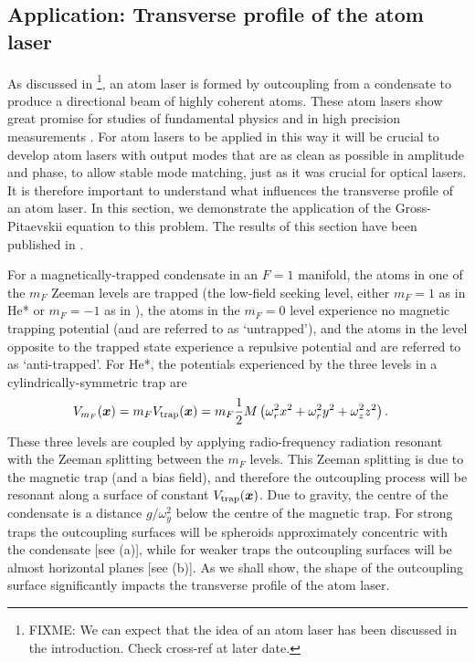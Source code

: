 \subsection{Application: Transverse profile of the atom laser}
\label{BackgroundTheory:TransverseProfile}

As discussed in \footnote{FIXME: We can expect that the idea of an atom laser has been discussed in the introduction.  Check cross-ref at later date.}, an atom laser is formed by outcoupling from a condensate to produce a directional beam of highly coherent atoms.  These atom lasers show great promise for studies of fundamental physics and in high precision measurements \citep{Kasevich:2002}.  For atom lasers to be applied in this way it will be crucial to develop atom lasers with output modes that are as clean as possible in amplitude and phase, to allow stable mode matching, just as it was crucial for optical lasers.  It is therefore important to understand what influences the transverse profile of an atom laser.  In this section, we demonstrate the application of the Gross-Pitaevskii equation to this problem.  The results of this section have been published in \citet{Dall:2007}.

\parasep

For a magnetically-trapped condensate in an $F=1$ manifold, the atoms in one of the $m_F$ Zeeman levels are trapped (the low-field seeking level, either $m_F=1$ as in He* or $m_F=-1$ as in ), the atoms in the $m_F=0$ level experience no magnetic trapping potential (and are referred to as `untrapped'), and the atoms in the level opposite to the trapped state experience a repulsive potential and are referred to as `anti-trapped'.  For He*, the potentials experienced by the three levels in a cylindrically-symmetric trap are
\begin{align}
    V_{m_F}(\bm{x}) &= m_F V_\text{trap}(\bm{x}) = m_F \frac{1}{2} M \left(\omega_r^2 x^2 + \omega_r^2 y^2 + \omega_z^2 z^2 \right).
\end{align}
These three levels are coupled by applying radio-frequency radiation resonant with the Zeeman splitting between the $m_F$ levels.  This Zeeman splitting is due to the magnetic trap (and a bias field), and therefore the outcoupling process will be resonant along a surface of constant $V_\text{trap}(\bm{x})$.  Due to gravity, the centre of the condensate is a distance $g/\omega_y^2$ below the centre of the magnetic trap.  For strong traps the outcoupling surfaces will be spheroids approximately concentric with the condensate [see (a)], while for weaker traps the outcoupling surfaces will be almost horizontal planes [see (b)].  As we shall show, the shape of the outcoupling surface significantly impacts the transverse profile of the atom laser.

